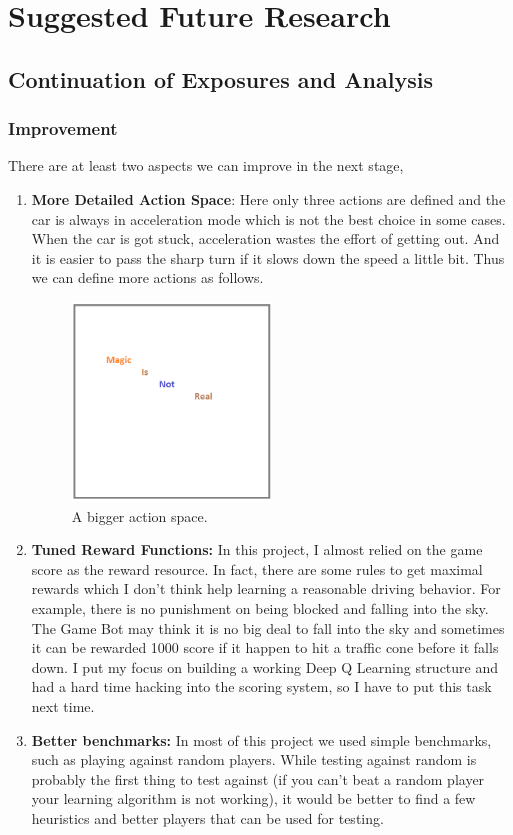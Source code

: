 \chapter{Suggested Future Research}
\section{Continuation of Exposures and Analysis}


\subsection{Improvement}
There are at least two aspects we can improve in the next stage,

\begin{enumerate}

    \item \textbf{More Detailed Action Space}: Here only three actions are defined and the car is always in acceleration mode which is not the best choice in some cases. When the car is got stuck, acceleration wastes the effort of getting out. And it is easier to pass the sharp turn if it slows down the speed a little bit. Thus we can define more actions as follows.
	\begin{figure}[h]
	\centering
	\includegraphics[width=0.5\textwidth]{figs/magic}
	\caption{A bigger action space.}
	\end{figure}    
    
    \item \textbf{Tuned Reward Functions:} In this project, I almost relied on the game score as the reward resource. In fact, there are some rules to get maximal rewards which I don't think help learning a reasonable driving behavior. For example, there is no punishment on being blocked and falling into the sky. The Game Bot may think it is no big deal to fall into the sky and sometimes it can be rewarded 1000 score if it happen to hit a traffic cone before it falls down. I put my focus on building a working Deep Q Learning structure and had a hard time hacking into the scoring system, so I have to put this task next time.
    \item \textbf{Better benchmarks:} In most of this project we used simple benchmarks, such as playing against random players. While testing against random is probably the first thing to test against (if you can't beat a random player your learning algorithm is not working), it would be better to find a few heuristics and better players that can be used for testing.


\end{enumerate}
